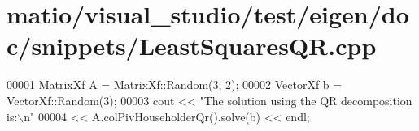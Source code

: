\hypertarget{matio_2visual__studio_2test_2eigen_2doc_2snippets_2_least_squares_q_r_8cpp_source}{}\section{matio/visual\+\_\+studio/test/eigen/doc/snippets/\+Least\+Squares\+QR.cpp}
\label{matio_2visual__studio_2test_2eigen_2doc_2snippets_2_least_squares_q_r_8cpp_source}

\begin{DoxyCode}
00001 MatrixXf A = MatrixXf::Random(3, 2);
00002 VectorXf b = VectorXf::Random(3);
00003 cout << \textcolor{stringliteral}{"The solution using the QR decomposition is:\(\backslash\)n"}
00004      << A.colPivHouseholderQr().solve(b) << endl;
\end{DoxyCode}
